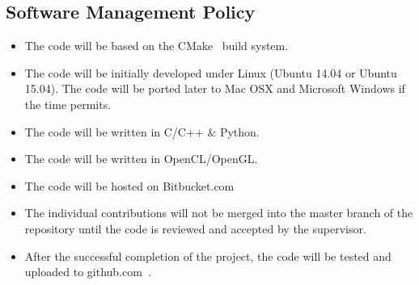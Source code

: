 \documentclass[12pt]{article} 				%
\begin{document}
\subsection{Software Management Policy}
\begin{itemize}
\item The code will be based on the CMake~\cite{cmake} build system. 
\item The code will be initially developed under Linux (Ubuntu 14.04 or Ubuntu 15.04). The code will be ported later to Mac OSX and Microsoft Windows if the time permits. 
\item The code will be written in C/C++ \& Python.
\item The code will be written in OpenCL/OpenGL.
\item The code will be hosted on Bitbucket.com~\cite{bitbucket}
\item The individual contributions will not be merged into the master branch of the repository until the code is reviewed and accepted by the supervisor.
\item After the successful completion of the project, the code will be tested and uploaded to github.com~\cite{github}. 
\end{itemize}

\newpage

		

	 
\end{document}
